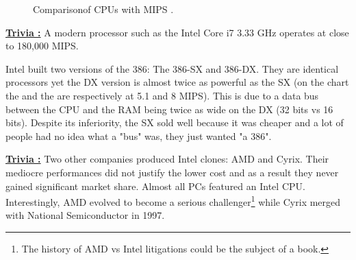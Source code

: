 \documentclass[book.tex]{subfiles}
\begin{document}
\begin{figure}[H]
\centering
   \caption{Comparison\protect\footnotemark of CPUs with MIPS \protect\footnotemark.}
 \end{figure}
 \par
  \textbf{\underline{Trivia :}} A modern processor such as the Intel Core i7 3.33 GHz operates at close to 180,000 MIPS.\\
  \par
 Intel built two versions of the 386: The 386-SX and 386-DX. They are identical processors yet the DX version is almost twice as powerful as the SX (on the chart the  and the  are respectively at 5.1 and 8 MIPS). This is due to a data bus between the CPU and the RAM being twice as wide on the DX (32 bits vs 16 bits). Despite its inferiority, the SX sold well because it was cheaper and a lot of people had no idea what a "bus" was, they just wanted "a 386".\\



 \par
\textbf{\underline{Trivia :}} Two other companies produced Intel clones: AMD and Cyrix. Their mediocre performances did not justify the lower cost and as a result they never gained significant market share. Almost all PCs featured an Intel CPU. Interestingly, AMD evolved to become a serious challenger\footnote{The history of AMD vs Intel litigations could be the subject of a book.} while Cyrix merged with National Semiconductor in 1997.\\
\par
\end{document}
